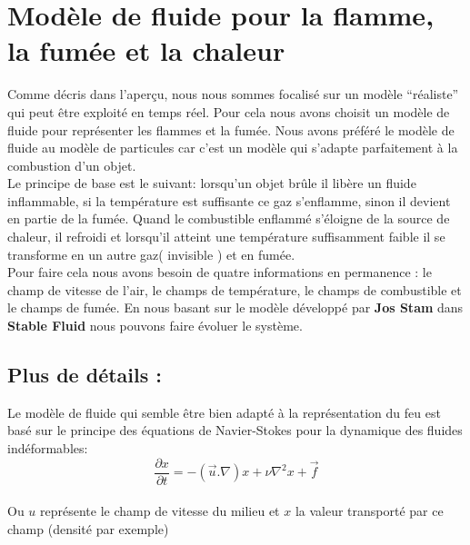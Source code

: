 \documentclass[a4paper,10pt]{article}
\begin{document}
\newpage
\section{Modèle de fluide pour la flamme, la fumée et la chaleur}
Comme décris dans l'aperçu, nous nous sommes focalisé sur un modèle
``réaliste'' qui peut être exploité en temps réel. Pour cela nous
avons choisit un modèle de fluide pour représenter les flammes et la fumée. 
Nous avons préféré le modèle de fluide au modèle de particules
car c'est un modèle qui s'adapte parfaitement à la combustion d'un objet.\\

Le principe de base est le suivant: lorsqu'un objet brûle il libère un
fluide inflammable, si la température est suffisante ce gaz
s'enflamme, sinon il devient en partie de la fumée. Quand le
combustible enflammé s'éloigne de la source de chaleur, il refroidi et
lorsqu'il atteint une température suffisamment faible il se transforme
en un autre gaz( invisible ) et en fumée.\\

Pour faire cela nous avons besoin de quatre informations en permanence
: le champ de vitesse de l'air, le champs de température, le champs de combustible
 et le champs de fumée. En nous basant sur le modèle développé par \textbf{Jos Stam} 
 dans \textbf{Stable Fluid} nous pouvons faire évoluer le système.\\


\subsection{Plus de détails :}
Le modèle de fluide qui semble être bien adapté à la représentation du
feu est basé sur le principe des équations de Navier-Stokes pour la
dynamique des fluides indéformables:\\
\begin{equation}
   \frac{\partial x}{\partial t} = -(\vec{u}.\nabla)x + \nu{\nabla^2}x+ \vec{f} 
\end{equation}
\\
Ou $u$ représente le champ de vitesse du milieu et $x$ la valeur
transporté par ce champ (densité par exemple)\\
\end{document}

